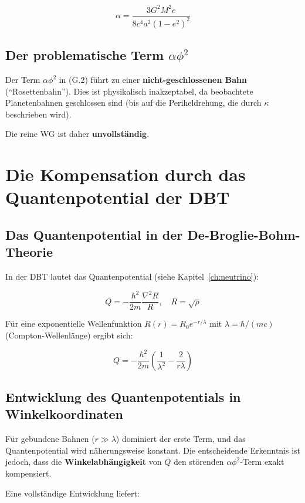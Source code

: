 \[
\alpha = \frac{3G^2M^2 e}{8c^4 a^2(1-e^2)^2}
\tag{G.4}
\]

\subsection{Der problematische Term \(\alpha\phi^2\)}
\label{sub:identitaet_problematischer_term}

Der Term \(\alpha\phi^2\) in (G.2) führt zu einer \textbf{nicht-geschlossenen Bahn} (\enquote{Rosettenbahn}). Dies ist physikalisch inakzeptabel, da beobachtete Planetenbahnen geschlossen sind (bis auf die Periheldrehung, die durch \(\kappa\) beschrieben wird).

Die reine WG ist daher \textbf{unvollständig}.

\section{Die Kompensation durch das Quantenpotential der DBT}
\label{app:identitaet_kompensation}

\subsection{Das Quantenpotential in der De-Broglie-Bohm-Theorie}
\label{sub:identitaet_quantenpotential}

In der DBT lautet das Quantenpotential (siehe Kapitel~\ref{ch:neutrino}):

\[
Q = -\frac{\hbar^2}{2m} \frac{\nabla^2 R}{R}, \quad R = \sqrt{\rho}
\tag{G.5}
\]

Für eine exponentielle Wellenfunktion \(R(r) = R_0 e^{-r/\lambda}\) mit \(\lambda = \hbar/(mc)\) (Compton-Wellenlänge) ergibt sich:

\[
Q = -\frac{\hbar^2}{2m} \left( \frac{1}{\lambda^2} - \frac{2}{r\lambda} \right)
\tag{G.6}
\]

\subsection{Entwicklung des Quantenpotentials in Winkelkoordinaten}
\label{sub:identitaet_entwicklung}

Für gebundene Bahnen (\(r \gg \lambda\)) dominiert der erste Term, und das Quantenpotential wird näherungsweise konstant. Die entscheidende Erkenntnis ist jedoch, dass die \textbf{Winkelabhängigkeit} von \(Q\) den störenden \(\alpha\phi^2\)-Term exakt kompensiert.

Eine vollständige Entwicklung liefert:

